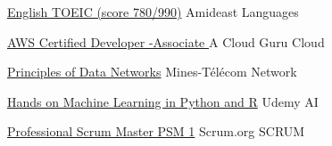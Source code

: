 \newcommand{\urlNewWindow}[1]{\href[pdfnewwindow=true]{#1}{\nolinkurl{#1}}}




\begin{cvhonors}

  \cvhonor
    {} %
    {\href{https://drive.google.com/file/d/0B-JcY6JJq2o8cmtWSm1ydnk1anc/view}{{\hspace{1mm} English TOEIC (score 780/990)}}}%
    {Amideast} %
    {Languages} %

 \cvhonor
    {} %
    {\href{https://drive.google.com/file/d/1F22jj_CrNvo4VkeuDmRng-R4g0e_LUfc/view}{{\hspace{1mm} AWS Certified Developer -Associate }}}%
    {A Cloud Guru} %
    {Cloud} %

  \cvhonor
    {} %
    {\href{https://www.cvtrust.com/SmartDiploma/Default.aspx?xVyP15sFUKhhZYYSkTh/gZ+USyBrUQL+51c7cp1nHf9Qlno7xHUeqmlWDHvVj5gO}{{\hspace{1mm} Principles of Data Networks}}}%
    { Mines-Télécom } %
    {Network} %

  \cvhonor
    {} %
    {\href{https://www.udemy.com/certificate/UC-WY8LMVX2/}{{\hspace{1mm}Hands on Machine Learning in Python and R}}}%
    {Udemy} %
    {AI} %

  \cvhonor
    {} %
    {\href{https://drive.google.com/file/d/1Np0XF8Lp99kaLGcngStGzi-czhxU19N0/view}{{\hspace{1mm}Professional Scrum Master PSM 1}}} %
    {Scrum.org} %
    {SCRUM} %

\end{cvhonors}


